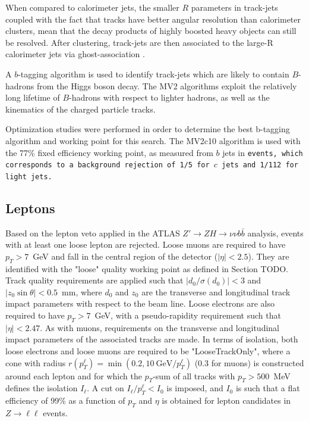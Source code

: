 When compared to calorimeter jets, the smaller $R$ parameters in track-jets coupled with the fact that tracks have better angular resolution than calorimeter clusters, mean that the decay products of highly boosted heavy objects can still be resolved.
After clustering, track-jets are then associated to the large-R calorimeter jets via ghost-association \cite{Cacciari:2008gn}.

A $b$-tagging algorithm is used to identify track-jets which are likely to contain $B$-hadrons from the Higgs boson decay. The MV2 algorithms exploit the relatively long lifetime of $B$-hadrons with respect to lighter hadrons, as well as the kinematics of the charged particle tracks.

Optimization studies were performed in order to determine the best b-tagging algorithm and working point for this search.
The MV2c10 algorithm is used with the 77\% fixed efficiency working point, as measured from $b$ jets in \tt events, which corresponds to a background rejection of 1/5 for $c$ jets and 1/112 for light jets.

\subsection{Leptons}
\label{sec:leptons}
Based on the lepton veto applied in the ATLAS $Z' \rightarrow ZH\rightarrow \nu\nu b\bar{b}$ analysis, events with at least one loose lepton are rejected.
Loose muons are required to have $p_{T}>7$~GeV and fall in the central region of the detector ($|\eta|<2.5$). They are identified with the "loose" quality working point as defined in Section TODO. Track quality requirements are applied such that $|d_{0}/\sigma(d_{0})|<3$ and $|z_{0}\sin\theta|<0.5$~mm, where $d_{0}$ and $z_{0}$ are the transverse and longitudinal track impact parameters with respect to the beam line. Loose electrons are also required to have $p_{T}>7$~GeV, with a pseudo-rapidity requirement such that $|\eta|<2.47$. As with muons, requirements on the transverse and longitudinal impact parameters of the associated tracks are made. In terms of isolation, both loose electrons and loose muons are required to be "LooseTrackOnly", where a cone with radius $r(p_{T}^{\ell})=\min(0.2,10~\text{GeV}/p_{T}^{\ell})$ (0.3 for muons) is constructed around each lepton and for which the $p_{T}$-sum of all tracks with $p_{T}>500$~MeV defines the isolation $I_\ell$. A cut on $I_\ell/p_{T}^{\ell}<I_{0}$ is imposed, and $I_{0}$ is such that a flat efficiency of 99\% as a function of $p_{T}$ and $\eta$ is obtained for lepton candidates in $Z\rightarrow \ell \ell$ events.

